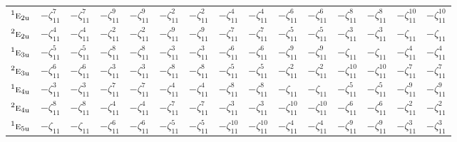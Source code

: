 \documentclass[10pt,a4paper]{article}
\numberwithin{equation}{section}
\newcommand{\irr}[1]{\text{\normalfont\scshape #1}}
\newcommand{\conjpair}[1]{{}^{#1}}
\newcommand{\ptag}[1]{\mathrm{#1}}
\newcommand{\rootunity}[1]{\zeta_{#1}}
\begin{document}
{\begin{longtable}{@{}lcccccccccccccc@{}}
$\conjpair{1}\irr{e}_{2\ptag{u}}$ & $-\rootunity{11}^{7}$ & $-\rootunity{11}^{7}$ & $-\rootunity{11}^{9}$ & $-\rootunity{11}^{9}$ & $-\rootunity{11}^{2}$ & $-\rootunity{11}^{2}$ & $-\rootunity{11}^{4}$ & $-\rootunity{11}^{4}$ & $-\rootunity{11}^{6}$ & $-\rootunity{11}^{6}$ & $-\rootunity{11}^{8}$ & $-\rootunity{11}^{8}$ & $-\rootunity{11}^{10}$ & $-\rootunity{11}^{10}$\\
$\conjpair{2}\irr{e}_{2\ptag{u}}$ & $-\rootunity{11}^{4}$ & $-\rootunity{11}^{4}$ & $-\rootunity{11}^{2}$ & $-\rootunity{11}^{2}$ & $-\rootunity{11}^{9}$ & $-\rootunity{11}^{9}$ & $-\rootunity{11}^{7}$ & $-\rootunity{11}^{7}$ & $-\rootunity{11}^{5}$ & $-\rootunity{11}^{5}$ & $-\rootunity{11}^{3}$ & $-\rootunity{11}^{3}$ & $-\rootunity{11}$ & $-\rootunity{11}$\\
$\conjpair{1}\irr{e}_{3\ptag{u}}$ & $-\rootunity{11}^{5}$ & $-\rootunity{11}^{5}$ & $-\rootunity{11}^{8}$ & $-\rootunity{11}^{8}$ & $-\rootunity{11}^{3}$ & $-\rootunity{11}^{3}$ & $-\rootunity{11}^{6}$ & $-\rootunity{11}^{6}$ & $-\rootunity{11}^{9}$ & $-\rootunity{11}^{9}$ & $-\rootunity{11}$ & $-\rootunity{11}$ & $-\rootunity{11}^{4}$ & $-\rootunity{11}^{4}$\\
$\conjpair{2}\irr{e}_{3\ptag{u}}$ & $-\rootunity{11}^{6}$ & $-\rootunity{11}^{6}$ & $-\rootunity{11}^{3}$ & $-\rootunity{11}^{3}$ & $-\rootunity{11}^{8}$ & $-\rootunity{11}^{8}$ & $-\rootunity{11}^{5}$ & $-\rootunity{11}^{5}$ & $-\rootunity{11}^{2}$ & $-\rootunity{11}^{2}$ & $-\rootunity{11}^{10}$ & $-\rootunity{11}^{10}$ & $-\rootunity{11}^{7}$ & $-\rootunity{11}^{7}$\\
$\conjpair{1}\irr{e}_{4\ptag{u}}$ & $-\rootunity{11}^{3}$ & $-\rootunity{11}^{3}$ & $-\rootunity{11}^{7}$ & $-\rootunity{11}^{7}$ & $-\rootunity{11}^{4}$ & $-\rootunity{11}^{4}$ & $-\rootunity{11}^{8}$ & $-\rootunity{11}^{8}$ & $-\rootunity{11}$ & $-\rootunity{11}$ & $-\rootunity{11}^{5}$ & $-\rootunity{11}^{5}$ & $-\rootunity{11}^{9}$ & $-\rootunity{11}^{9}$\\
$\conjpair{2}\irr{e}_{4\ptag{u}}$ & $-\rootunity{11}^{8}$ & $-\rootunity{11}^{8}$ & $-\rootunity{11}^{4}$ & $-\rootunity{11}^{4}$ & $-\rootunity{11}^{7}$ & $-\rootunity{11}^{7}$ & $-\rootunity{11}^{3}$ & $-\rootunity{11}^{3}$ & $-\rootunity{11}^{10}$ & $-\rootunity{11}^{10}$ & $-\rootunity{11}^{6}$ & $-\rootunity{11}^{6}$ & $-\rootunity{11}^{2}$ & $-\rootunity{11}^{2}$\\
$\conjpair{1}\irr{e}_{5\ptag{u}}$ & $-\rootunity{11}$ & $-\rootunity{11}$ & $-\rootunity{11}^{6}$ & $-\rootunity{11}^{6}$ & $-\rootunity{11}^{5}$ & $-\rootunity{11}^{5}$ & $-\rootunity{11}^{10}$ & $-\rootunity{11}^{10}$ & $-\rootunity{11}^{4}$ & $-\rootunity{11}^{4}$ & $-\rootunity{11}^{9}$ & $-\rootunity{11}^{9}$ & $-\rootunity{11}^{3}$ & $-\rootunity{11}^{3}$\\

\end{longtable}}
\end{document}
